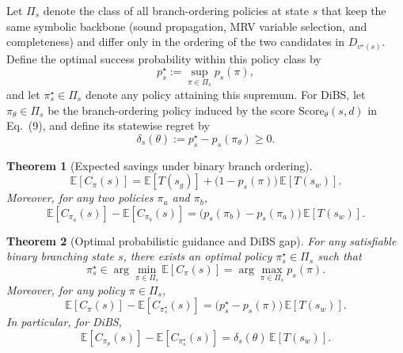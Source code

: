 \documentclass[lettersize,journal]{IEEEtran}
\newtheorem{theorem}{Theorem}
\begin{document}
Let $\Pi_s$ denote the class of all branch-ordering policies at state $s$ that keep the same symbolic
backbone (sound propagation, MRV variable selection, and completeness) and differ only in the ordering
of the two candidates in $D_{v^\star(s)}$.
Define the optimal success probability within this policy class by
\begin{equation}
	p_s^\star := \sup_{\pi\in\Pi_s} p_s(\pi),
	\label{eq:ps_star_def}
\end{equation}
and let $\pi_s^\star\in\Pi_s$ denote any policy attaining this supremum.
For DiBS, let $\pi_\theta\in\Pi_s$ be the branch-ordering policy induced by the score
$\mathrm{Score}_\theta(s,d)$ in Eq.~(9), and define its statewise regret by
\begin{equation}
	\delta_s(\theta) := p_s^\star - p_s(\pi_\theta)\ge 0.
	\label{eq:delta_def}
\end{equation}

\begin{theorem}[Expected savings under binary branch ordering]
	\label{thm:binary_cost}
	\begin{equation}
		\mathbb{E}[C_\pi(s)]
		=
		\mathbb{E}[T(s_g)]
		+
		\bigl(1-p_s(\pi)\bigr)\,\mathbb{E}[T(s_w)].
		\label{eq:binary_decomp}
	\end{equation}
	Moreover, for any two policies $\pi_a$ and $\pi_b$,
	\begin{equation}
		\mathbb{E}[C_{\pi_a}(s)]-\mathbb{E}[C_{\pi_b}(s)]
		=
		\bigl(p_s(\pi_b)-p_s(\pi_a)\bigr)\,\mathbb{E}[T(s_w)].
		\label{eq:binary_gap}
	\end{equation}
\end{theorem}

\begin{theorem}[Optimal probabilistic guidance and DiBS gap]
	\label{thm:optimal_guidance}
	For any satisfiable binary branching state $s$, there exists an optimal policy
	$\pi_s^\star\in\Pi_s$ such that
	\begin{equation}
		\pi_s^\star
		\in
		\arg\min_{\pi\in\Pi_s}\mathbb{E}[C_\pi(s)]
		=
		\arg\max_{\pi\in\Pi_s} p_s(\pi).
		\label{eq:optimal_equiv}
	\end{equation}
	Moreover, for any policy $\pi\in\Pi_s$,
	\begin{equation}
		\mathbb{E}[C_\pi(s)]-\mathbb{E}[C_{\pi_s^\star}(s)]
		=
		\bigl(p_s^\star-p_s(\pi)\bigr)\,\mathbb{E}[T(s_w)].
		\label{eq:oracle_gap_general}
	\end{equation}
	In particular, for DiBS,
	\begin{equation}
		\mathbb{E}[C_{\pi_\theta}(s)]-\mathbb{E}[C_{\pi_s^\star}(s)]
		=
		\delta_s(\theta)\,\mathbb{E}[T(s_w)].
		\label{eq:oracle_gap_dibs}
	\end{equation}
\end{theorem}
\end{document}
